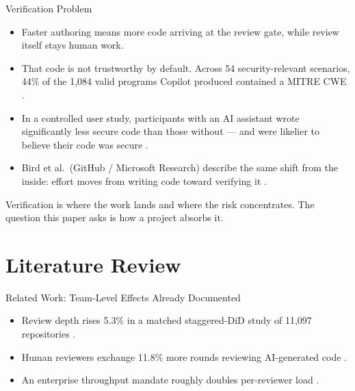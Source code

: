 \begin{frame}{Verification Problem}
\begin{itemize}
  \item Faster authoring means more code arriving at the review gate,
        while review itself stays human work.
  \item That code is not trustworthy by default. Across 54
        security-relevant scenarios, 44\% of the 1,084 valid programs
        Copilot produced contained a MITRE CWE
        \cite{pearce2022asleep}.
  \item In a controlled user study, participants with an AI assistant
        wrote significantly less secure code than those without --- and
        were likelier to believe their code was secure
        \cite{perry2023users}.
  \item Bird et al.\ (GitHub / Microsoft Research) describe the same
        shift from the inside: effort moves from writing code toward
        verifying it \cite{bird2023taking}.
\end{itemize}
\vspace{0.3em}
Verification is where the work lands and where the risk concentrates.
The question this paper asks is how a project absorbs it.
\end{frame}

\section{Literature Review}

\begin{frame}{Related Work: Team-Level Effects Already Documented}
\begin{itemize}
  \item Review depth rises 5.3\% in a matched staggered-DiD study of
        11,097 repositories \cite{zhang2026augmentation}.
  \item Human reviewers exchange 11.8\% more rounds reviewing
        AI-generated code \cite{zhong2026synergy}.
  \item An enterprise throughput mandate roughly doubles per-reviewer
        load \cite{he2026aiwrites}.
\end{itemize}
\end{frame}

